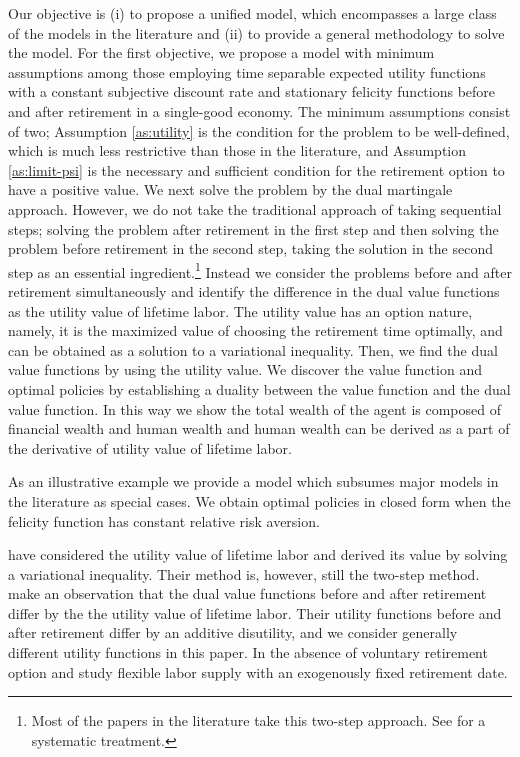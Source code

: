 \documentclass[a4paper,report, 11pt]{article}
\begin{document}
Our objective is (i) to propose a unified model, which encompasses a large class of the models in the literature and (ii) to provide a general methodology to solve the model. For the first objective, we propose a model with  minimum assumptions among those employing time separable expected utility functions with a constant subjective discount rate and stationary felicity functions before and after retirement in a single-good economy. The minimum assumptions consist of two;  Assumption \ref{as:utility}   is the condition for the problem to be well-defined, which is much less restrictive than those in the literature,  and  Assumption \ref{as:limit-psi} is  the necessary and sufficient condition  for the retirement option to have a positive value. We next solve the problem by the dual martingale approach.  However, we  do not take the traditional approach of taking sequential steps; solving the problem after retirement in the first step and then solving the problem before retirement in the second step, taking the solution in the second step as an essential ingredient.\footnote{Most of the papers in the literature take this two-step approach. See \citet{YK} for a systematic treatment.} Instead we consider the problems before and after retirement simultaneously and identify the difference in the dual value functions as the utility value of lifetime labor. The utility value has an option nature, namely, it is the maximized value of choosing the retirement time optimally, and can be obtained as a solution to a variational inequality. Then, we find the dual value functions by using the utility value. We discover the value function and optimal policies by establishing a duality between the value function and the dual value function. In this way we show the total wealth of the agent is composed of financial wealth and human wealth and human wealth can be derived as a part of the derivative of utility value of lifetime labor.

As an illustrative example we provide a model which subsumes major models in the literature as special cases.  We obtain optimal policies in closed form when the felicity function has constant relative risk aversion. 


\citet{YK} have considered the utility value of lifetime labor and derived its value by solving a variational inequality. Their method is, however, still the  two-step method.  \citet{JP2020} make an observation that  the dual value functions before and after retirement differ by the the utility value of lifetime labor. Their utility functions  before and after retirement differ by an additive disutility, and we consider generally different utility functions in this paper. In the absence of voluntary retirement option  
\citet{BMS1992} and \citet{BDOW2004} study flexible labor supply with an exogenously fixed retirement date.
\end{document}

